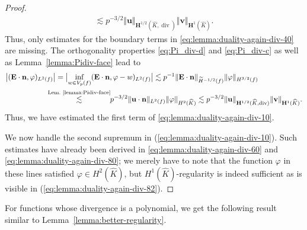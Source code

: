 \documentclass{article}
\begin{document}
\begin{proof}
\begin{align}
\nonumber 
\lesssim p^{-3/2} \Vert\mathbf{u}\Vert_{\mathbf{H}^{1/2}(\widehat{K},\operatorname{div})} 
                \Vert{\mathbf v}\Vert_{{\mathbf H}^1(\widehat{K})}.
\end{align}
Thus, only estimates for the boundary terms in \eqref{eq:lemma:duality-again-div-40} are missing. 
The orthogonality properties \eqref{eq:Pi_div-d} and \eqref{eq:Pi_div-c} as well as Lemma~\ref{lemma:Pidiv-face} lead to
\begin{align*}
\bigl|(\mathbf{E}\cdot\mathbf{n},\varphi)_{L^2(f)}\bigr| 
&= \bigl| \operatorname*{inf}_{w\in V_p(f)} (\mathbf{E}\cdot\mathbf{n},\varphi-w)_{L^2(f)} \bigr|
\lesssim p^{-1} \Vert\mathbf{E}\cdot\mathbf{n}\Vert_{\widetilde{H}^{-1/2}(f)} \Vert\varphi\Vert_{H^{3/2}(f)} \\
&\!\!\!\!\!\!\!\!\stackrel{\text{Lem.~\ref{lemma:Pidiv-face}}}{\lesssim}\!\! p^{-3/2} \Vert\mathbf{u}\cdot\mathbf{n}\Vert_{L^2(f)} \Vert\varphi\Vert_{H^2(\widehat{K})} \lesssim p^{-3/2} \Vert\mathbf{u}\Vert_{\mathbf{H}^{1/2}(\widehat{K},\operatorname{div})} \Vert\mathbf{v}\Vert_{\mathbf{H}^1(\widehat{K})}.
\end{align*}
Thus, we have estimated the first term of \eqref{eq:lemma:duality-again-div-10}.

We now handle the second supremum in (\ref{eq:lemma:duality-again-div-10}). 
Such estimates have already been derived  in \eqref{eq:lemma:duality-again-div-60} 
and \eqref{eq:lemma:duality-again-div-80}; we merely have to note  
that the function $\varphi$ in these lines satisfied $\varphi\in H^2(\widehat{K})$, 
but $H^1(\widehat{K})$-regularity is indeed sufficient as is visible in (\ref{eq:lemma:duality-again-div-82}). 
\end{proof}

For functions whose divergence is a polynomial, we get the following result similar to Lemma~\ref{lemma:better-regularity}.
\end{document}
